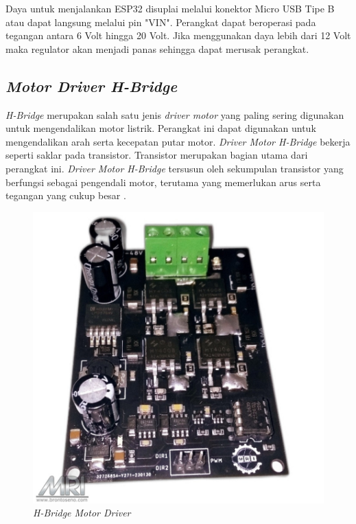 Daya untuk menjalankan ESP32 disuplai melalui konektor Micro USB Tipe B atau dapat langsung melalui pin "VIN". Perangkat dapat beroperasi pada tegangan antara 6 Volt hingga 20 Volt. Jika menggunakan daya lebih dari 12 Volt maka regulator akan menjadi panas sehingga dapat merusak perangkat.

\subsection{\emph{Motor Driver H-Bridge}}

\emph{H-Bridge} merupakan salah satu jenis \emph{driver motor} yang paling sering digunakan untuk mengendalikan motor listrik. Perangkat ini dapat digunakan untuk mengendalikan arah serta kecepatan putar motor. \emph{Driver Motor H-Bridge} bekerja seperti saklar pada transistor. Transistor merupakan bagian utama dari perangkat ini. \emph{Driver Motor H-Bridge} tersusun oleh sekumpulan transistor yang berfungsi sebagai pengendali motor, terutama yang memerlukan arus serta tegangan yang cukup besar \parencite{Muhammad_2018}.

\begin{figure} [ht]
    \centering
        \includegraphics[scale=0.2]{gambar/MotorDriver.png}
        \caption{\emph{H-Bridge Motor Driver}}
        \label{fig:DriverMotor}
\end{figure}


